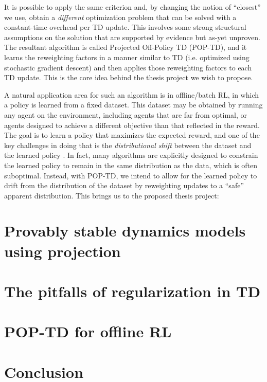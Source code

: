 \documentclass[11pt]{book}
\begin{document}
It is possible to apply the same criterion and, by changing the notion of ``closest'' we use, obtain a \emph{different} optimization problem that can be solved with a constant-time overhead per TD update. This involves some strong structural assumptions on the solution that are supported by evidence but as-yet unproven. The resultant algorithm is called Projected Off-Policy TD (POP-TD), and it learns the reweighting factors in a manner similar to TD (i.e. optimized using stochastic gradient descent) and then applies those reweighting factors to each TD update. This is the core idea behind the thesis project we wish to propose.

A natural application area for such an algorithm is in offline/batch RL, in which a policy is learned from a fixed dataset. This dataset may be obtained by running any agent on the environment, including agents that are far from optimal, or agents designed to achieve a different objective than that reflected in the reward. The goal is to learn a policy that maximizes the expected reward, and one of the key challenges in doing that is the \emph{distributional shift} between the dataset and the learned policy \cite{levine2020survey}. In fact, many algorithms are explicitly designed to constrain the learned policy to remain in the same distribution as the data, which is often suboptimal. Instead, with POP-TD, we intend to allow for the learned policy to drift from the distribution of the dataset by reweighting updates to a ``safe'' apparent distribution. This brings us to the proposed thesis project:


\mainmatter
\chapter{Provably stable dynamics models using projection}

\chapter{The pitfalls of regularization in TD}

\chapter{POP-TD for offline RL}


\chapter{Conclusion}
\end{document}
